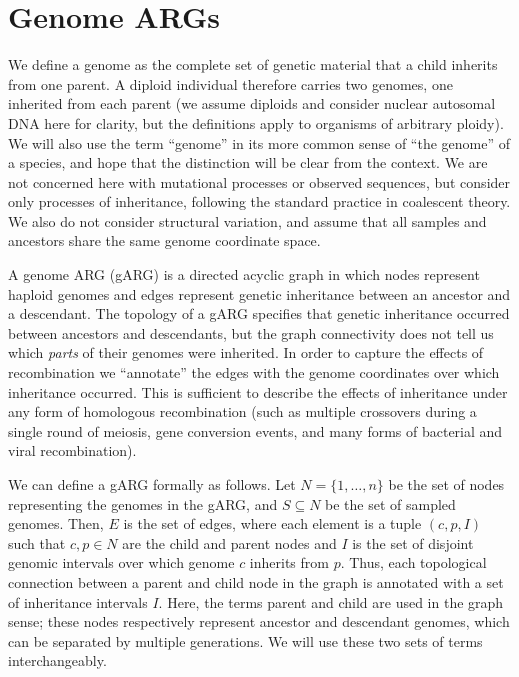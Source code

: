 \documentclass[9pt,twocolumn,twoside]{gsajnl}
\begin{document}
\section{Genome ARGs}
\label{sec-gARG}
We define a genome as the complete set of genetic material that a child
inherits from one parent. A diploid individual
therefore carries two genomes, one inherited from each parent (we assume diploids and consider nuclear autosomal DNA here
for clarity, but the definitions apply to organisms of arbitrary ploidy).
We will also use the term ``genome'' in its
more common sense of ``the genome'' of a species,
and hope that the distinction will be clear from the context.
We are not concerned here with mutational processes or observed sequences,
but consider only processes of inheritance,
following the standard practice in coalescent theory.
We also do not consider structural variation, and assume that all
samples and ancestors share the same genome coordinate space.

A genome ARG (gARG) is a directed acyclic graph in which nodes represent
haploid genomes and edges represent
genetic inheritance between an ancestor and a descendant.
The topology of a gARG specifies that genetic inheritance
occurred between
ancestors and descendants, but the graph connectivity
does not tell us which \emph{parts} of their genomes were inherited.
In order to capture the effects of recombination
 we ``annotate'' the edges with the genome
coordinates over which inheritance occurred.
This is sufficient to describe the effects of inheritance under
any form of homologous recombination (such as multiple crossovers during a single round of meiosis,
gene conversion events, and many forms of bacterial and viral recombination).

We can define a gARG formally as follows.
Let $N = \{1, \dots, n\}$ be the set of nodes representing
the genomes in the gARG,
and  $S \subseteq N$ be the set of sampled genomes.
Then, $E$ is the set of edges, where each element
is a tuple $(c, p, I)$ such that $c, p \in N$ are the child and
parent nodes and $I$ is the set of disjoint genomic intervals
over which genome $c$ inherits from $p$.
Thus, each topological connection between
a parent and child node in the graph is annotated with a set of
inheritance intervals $I$.
Here, the terms parent and child are used in the graph sense;
these nodes respectively represent ancestor and descendant genomes,
which can be separated by multiple generations.
We will use these two sets of terms interchangeably.
\end{document}
